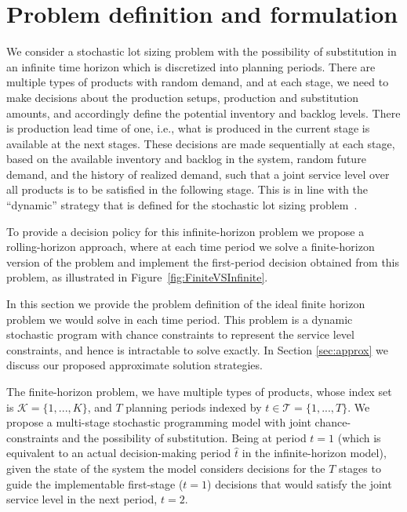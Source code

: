 \documentclass[10pt]{article}
\newcommand{\ti}{t} %
\newcommand{\TI}{\mathcal{T}}
\newcommand{\Ti}{T}
\newcommand{\KA}{\mathcal{K}}
\newcommand{\Ka}{K}
\newcommand{\tAct}{\hat{\ti}} %
\begin{document}
\section{Problem definition and formulation}
We consider a stochastic lot sizing problem with the possibility of substitution in an infinite time horizon which is discretized into planning periods. %
There are multiple types of products with random demand, and at each stage, we need to make decisions about the production setups, production and substitution amounts, and accordingly define the potential inventory and backlog levels. There is production lead time of one, i.e., what is produced in the current stage is available at the next stages. 
These decisions are made sequentially at each stage, based on the available inventory and backlog in the system, random future demand, and the history of realized demand, such that a joint service level over all products is to be satisfied in the following stage. This is in line with the  ``dynamic'' strategy that is defined for the stochastic lot sizing problem~\cite{bookbinder1988strategies}. 

To provide a decision policy for this infinite-horizon problem we propose a rolling-horizon approach, where at each time period we solve a finite-horizon version of the problem and implement the first-period decision obtained from this problem, as illustrated in Figure~\ref{fig:FiniteVSInfinite}. 

In this section we provide the problem definition of the ideal finite horizon problem we would solve in each time period. This problem is a dynamic stochastic program with chance constraints to represent the service level constraints, and hence is intractable to solve exactly. In Section \ref{sec:approx} we discuss our proposed approximate solution strategies.

The finite-horizon problem, we have multiple types of products, whose index set is $\KA= \{1,...,\Ka\}$, and $\Ti$ planning periods indexed by $\ti \in \TI=\{1 , ..., \Ti\}$. We propose a multi-stage stochastic programming model with joint chance-constraints and the possibility of substitution.
Being at period $t=1$  (which is equivalent to an actual decision-making period $\tAct$ in the infinite-horizon model), given the state of the system the model considers decisions for the $\Ti$ stages to guide the implementable first-stage ($\ti =1$) decisions that would satisfy the joint service level in the next period, $\ti=2$.
\end{document}
